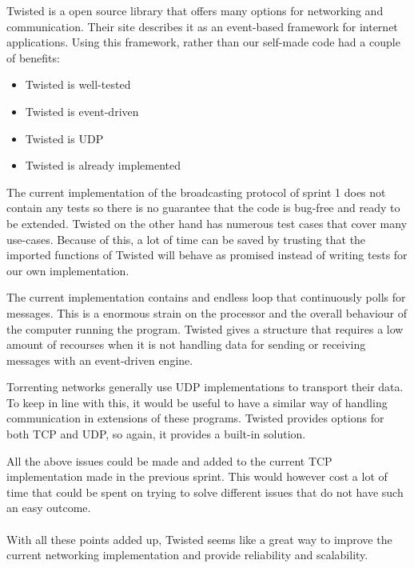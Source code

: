 \documentclass[]{article}
\begin{document}
Twisted is a open source library that offers many options for networking and communication. 
Their site describes it as an event-based framework for internet applications. Using this framework, rather than our self-made code had a couple of benefits:
\begin{itemize}
\item Twisted is well-tested
\item Twisted is event-driven
\item Twisted is UDP
\item Twisted is already implemented
\end{itemize}
The current implementation of the broadcasting protocol of sprint 1 does not contain any tests so there is no guarantee that the code is bug-free and ready to be extended.
Twisted on the other hand has numerous test cases that cover many use-cases.
Because of this, a lot of time can be saved by trusting that the imported functions of Twisted will behave as promised instead of writing tests for our own implementation.

The current implementation contains and endless loop that continuously polls for messages.
This is a enormous strain on the processor and the overall behaviour of the computer running the program.
Twisted gives a structure that requires a low amount of recourses when it is not handling data for sending or receiving messages with an event-driven engine.

Torrenting networks generally use UDP implementations to transport their data.
To keep in line with this, it would be useful to have a similar way of handling communication in extensions of these programs.
Twisted provides options for both TCP and UDP, so again, it provides a built-in solution.

All the above issues could be made and added to the current TCP implementation made in the previous sprint.
This would however cost a lot of time that could be spent on trying to solve different issues that do not have such an easy outcome. \\
\\
With all these points added up, Twisted seems like a great way to improve the current networking implementation and provide reliability and scalability.
\end{document}
